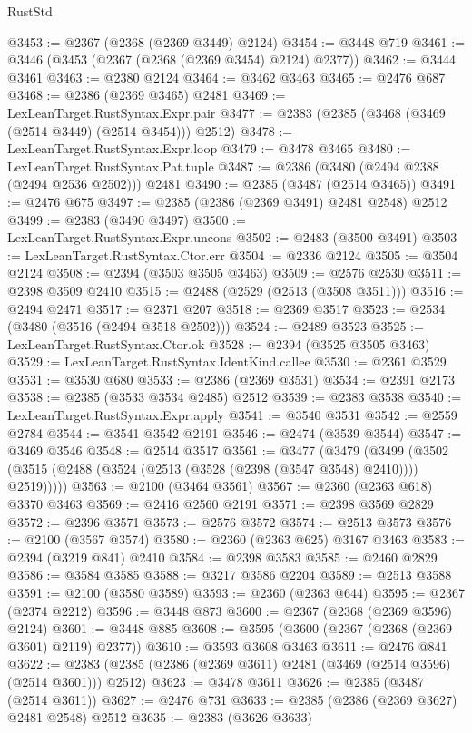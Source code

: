 \begin{lexlean}{RustStd}
\begin{coremodule}
{\begin{coremodule}
{{{{{{{{{{{{{{{{{{{{{{{{{{{{{{{{{{{{{{{{{{{{{{{{{{@3453 := @2367 (@2368 (@2369 @3449) @2124)
@3454 := @3448 @719
@3461 := @3446 (@3453 (@2367 (@2368 (@2369 @3454) @2124) @2377))
@3462 := @3444 @3461
@3463 := @2380 @2124
@3464 := @3462 @3463
@3465 := @2476 @687
@3468 := @2386 (@2369 @3465) @2481
@3469 := LexLeanTarget.RustSyntax.Expr.pair
@3477 := @2383 (@2385 (@3468 (@3469 (@2514 @3449) (@2514 @3454))) @2512)
@3478 := LexLeanTarget.RustSyntax.Expr.loop
@3479 := @3478 @3465
@3480 := LexLeanTarget.RustSyntax.Pat.tuple
@3487 := @2386 (@3480 (@2494 @2388 (@2494 @2536 @2502))) @2481
@3490 := @2385 (@3487 (@2514 @3465))
@3491 := @2476 @675
@3497 := @2385 (@2386 (@2369 @3491) @2481 @2548) @2512
@3499 := @2383 (@3490 @3497)
@3500 := LexLeanTarget.RustSyntax.Expr.uncons
@3502 := @2483 (@3500 @3491)
@3503 := LexLeanTarget.RustSyntax.Ctor.err
@3504 := @2336 @2124
@3505 := @3504 @2124
@3508 := @2394 (@3503 @3505 @3463)
@3509 := @2576 @2530
@3511 := @2398 @3509 @2410
@3515 := @2488 (@2529 (@2513 (@3508 @3511)))
@3516 := @2494 @2471
@3517 := @2371 @207
@3518 := @2369 @3517
@3523 := @2534 (@3480 (@3516 (@2494 @3518 @2502)))
@3524 := @2489 @3523
@3525 := LexLeanTarget.RustSyntax.Ctor.ok
@3528 := @2394 (@3525 @3505 @3463)
@3529 := LexLeanTarget.RustSyntax.IdentKind.callee
@3530 := @2361 @3529
@3531 := @3530 @680
@3533 := @2386 (@2369 @3531)
@3534 := @2391 @2173
@3538 := @2385 (@3533 @3534 @2485) @2512
@3539 := @2383 @3538
@3540 := LexLeanTarget.RustSyntax.Expr.apply
@3541 := @3540 @3531
@3542 := @2559 @2784
@3544 := @3541 @3542 @2191
@3546 := @2474 (@3539 @3544)
@3547 := @3469 @3546
@3548 := @2514 @3517
@3561 := @3477
    (@3479
      (@3499 (@3502 (@3515 (@2488 (@3524 (@2513 (@3528 (@2398 (@3547 @3548) @2410)))) @2519)))))
@3563 := @2100 (@3464 @3561)
@3567 := @2360 (@2363 @618) @3370 @3463
@3569 := @2416 @2560 @2191
@3571 := @2398 @3569 @2829
@3572 := @2396 @3571
@3573 := @2576 @3572
@3574 := @2513 @3573
@3576 := @2100 (@3567 @3574)
@3580 := @2360 (@2363 @625) @3167 @3463
@3583 := @2394 (@3219 @841) @2410
@3584 := @2398 @3583
@3585 := @2460 @2829
@3586 := @3584 @3585
@3588 := @3217 @3586 @2204
@3589 := @2513 @3588
@3591 := @2100 (@3580 @3589)
@3593 := @2360 (@2363 @644)
@3595 := @2367 (@2374 @2212)
@3596 := @3448 @873
@3600 := @2367 (@2368 (@2369 @3596) @2124)
@3601 := @3448 @885
@3608 := @3595 (@3600 (@2367 (@2368 (@2369 @3601) @2119) @2377))
@3610 := @3593 @3608 @3463
@3611 := @2476 @841
@3622 := @2383 (@2385 (@2386 (@2369 @3611) @2481 (@3469 (@2514 @3596) (@2514 @3601))) @2512)
@3623 := @3478 @3611
@3626 := @2385 (@3487 (@2514 @3611))
@3627 := @2476 @731
@3633 := @2385 (@2386 (@2369 @3627) @2481 @2548) @2512
@3635 := @2383 (@3626 @3633)
}}}}}}}}}}}}}}}}}}}}}}}}}}}}}}}}}}}}}}}}}}}}}}}}}}
\end{coremodule}}
\end{coremodule}
\end{lexlean}

